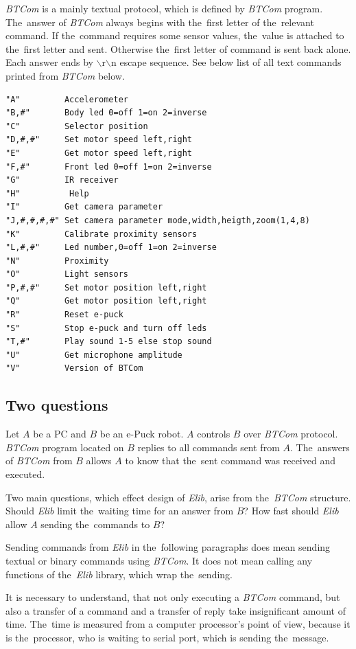   {\it BTCom} is a mainly textual protocol, which is defined by {\it BTCom} program. The~answer of {\it BTCom} always begins 
  with the~first letter of the~relevant command.
  If the~command requires some sensor values, the~value is attached to the~first letter and
  sent. Otherwise the~first letter of command is sent back alone. Each answer ends by 
  $\backslash$r$\backslash$n escape sequence.
  See below list of all text commands printed from {\it BTCom} below.
  \lstset{basicstyle=\small}
\begin{lstlisting}
"A"         Accelerometer
"B,#"       Body led 0=off 1=on 2=inverse
"C"         Selector position
"D,#,#"     Set motor speed left,right
"E"         Get motor speed left,right
"F,#"       Front led 0=off 1=on 2=inverse
"G"         IR receiver
"H"          Help
"I"         Get camera parameter
"J,#,#,#,#" Set camera parameter mode,width,heigth,zoom(1,4,8)
"K"         Calibrate proximity sensors
"L,#,#"     Led number,0=off 1=on 2=inverse
"N"         Proximity
"O"         Light sensors
"P,#,#"     Set motor position left,right
"Q"         Get motor position left,right
"R"         Reset e-puck
"S"         Stop e-puck and turn off leds
"T,#"       Play sound 1-5 else stop sound
"U"         Get microphone amplitude
"V"         Version of BTCom
\end{lstlisting}
    
  \subsection*{Two questions} %
  Let $A$ be a PC and $B$ be an e-Puck robot. $A$ controls $B$ over {\it BTCom} protocol. {\it BTCom} program located on $B$ 
  replies to all commands sent from $A$.
  The~answers of {\it BTCom} from $B$ allows $A$ to know that the~sent command was received and
  executed. 
   
  Two main questions, which effect design of {\it Elib}, arise from the~{\it BTCom} structure.
  Should {\it Elib} limit the~waiting time for an answer from $B$?
  How fast should {\it Elib} allow $A$ sending the~commands to $B$?
  \begin{remark}
  Sending commands from {\it Elib} in the~following paragraphs does mean 
  sending textual or binary commands
  using {\it BTCom}. It does not mean calling any functions of the~{\it Elib} library, which wrap the~sending. 
  \end{remark}
   
  It is necessary to understand, that not only executing a {\it BTCom} command, 
  but also a transfer of a command and a transfer of reply take insignificant amount of time. 
  The~time is measured from a computer processor's point of view, because
  it is the~processor, who is waiting to serial port, which is sending the~message.
   
